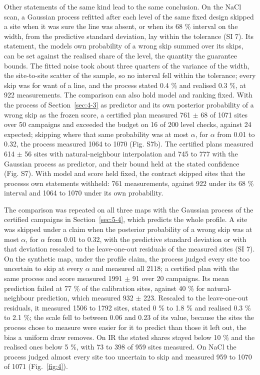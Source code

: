 \documentclass{iopjournal}
\begin{document}
Other statements of the same kind lead to the same conclusion. On the NaCl scan, a Gaussian process refitted after each level of the same fixed design skipped a site when it was sure the line was absent, or when its 68 \% interval on the width, from the predictive standard deviation, lay within the tolerance (SI 7). Its statement, the model\textquotesingle s own probability of a wrong skip summed over its skips, can be set against the realised share of the level, the quantity the guarantee bounds. The fitted noise took about three quarters of the variance of the width, the site-to-site scatter of the sample, so no interval fell within the tolerance; every skip was for want of a line, and the process stated 0.4 \% and realised 0.3 \%, at 922 measurements. The comparison can also hold model and ranking fixed. With the process of Section~\ref{sec:4-3} as predictor and its own posterior probability of a wrong skip as the frozen score, a certified plan measured 761 \ensuremath{\pm} 68 of 1071 sites over 50 campaigns and exceeded the budget on 16 of 200 level checks, against 24 expected; skipping where that same probability was at most \ensuremath{\alpha}, for \ensuremath{\alpha} from 0.01 to 0.32, the process measured 1064 to 1070 (Fig. S7b). The certified plans measured 614 \ensuremath{\pm} 56 sites with natural-neighbour interpolation and 745 to 777 with the Gaussian process as predictor, and their bound held at the stated confidence (Fig. S7). With model and score held fixed, the contract skipped sites that the process\textquotesingle s own statements withheld: 761 measurements, against 922 under its 68 \% interval and 1064 to 1070 under its own probability.

The comparison was repeated on all three maps with the Gaussian process of the certified campaigns in Section~\ref{sec:5-4}, which predicts the whole profile. A site was skipped under a claim when the posterior probability of a wrong skip was at most \ensuremath{\alpha}, for \ensuremath{\alpha} from 0.01 to 0.32, with the predictive standard deviation or with that deviation rescaled to the leave-one-out residuals of the measured sites (SI 7). On the synthetic map, under the profile claim, the process judged every site too uncertain to skip at every \ensuremath{\alpha} and measured all 2118; a certified plan with the same process and score measured 1991 \ensuremath{\pm} 91 over 20 campaigns. Its mean prediction failed at 77 \% of the calibration sites, against 40 \% for natural-neighbour prediction, which measured 932 \ensuremath{\pm} 223. Rescaled to the leave-one-out residuals, it measured 1506 to 1792 sites, stated 0 \% to 1.8 \% and realised 0.3 \% to 2.1 \%; the scale fell to between 0.06 and 0.23 of its value, because the sites the process chose to measure were easier for it to predict than those it left out, the bias a uniform draw removes. On IR the stated shares stayed below 10 \% and the realised ones below 5 \%, with 73 to 398 of 959 sites measured. On NaCl the process judged almost every site too uncertain to skip and measured 959 to 1070 of 1071 (Fig.~\ref{fig:4}).
\end{document}
